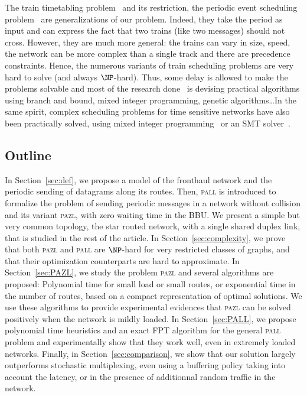 \documentclass[a4paper,10pt]{article}
\newcommand\pazl{\textsc{pazl}\xspace}
\newcommand\pall{\textsc{pall}\xspace}
\begin{document}
The train timetabling problem~\cite{lusby2011railway} and its restriction, the periodic event scheduling problem~\cite{serafini1989mathematical} are generalizations of our problem. Indeed, they take the period as input and can express the fact that two trains (like two messages) should not cross. However, they are much more general: the trains can vary in size, speed, the network can be more complex than a single track and there are precedence constraints. Hence, the numerous variants of train scheduling problems are very hard to solve (and always $\NP$-hard). Thus, some delay is allowed to make the problems solvable and most of the research done~\cite{lusby2011railway} is devising practical algorithms using branch and bound, mixed integer programming, genetic algorithms\dots  In the same spirit, complex scheduling problems for time sensitive networks have also been practically solved, using mixed integer programming~\cite{nayak2017incremental,steiner2018traffic} or an SMT solver~\cite{dos2019tsnsched}.


\subsection*{Outline}

 In Section~\ref{sec:def}, we propose a model of the fronthaul network and the periodic sending of datagrams along its routes. Then, \pall is introduced to formalize the problem of sending periodic messages in a network without collision and its variant \pazl, with zero waiting time in the BBU. We present a simple but very common topology, the star routed network, with a single shared duplex link, that is studied in the rest of the article.  In Section~\ref{sec:complexity}, we prove that both \pazl and \pall are $\NP$-hard for very restricted classes of graphs, and that their optimization counterparts are hard to approximate. 
 In Section~\ref{sec:PAZL}, we study the problem \pazl and several algorithms are proposed: Polynomial time for small load or small routes, or exponential time in the number of routes, based on a compact representation of optimal solutions. We use these algorithms to provide experimental evidences that \pazl can be solved positively when the network is mildly loaded. In Section~\ref{sec:PALL}, we propose polynomial time heuristics and an exact FPT algorithm for the general \pall problem and experimentally show that they work well, even in extremely loaded networks. 
Finally, in Section~\ref{sec:comparison}, we show that our solution largely outperforms stochastic multiplexing, even using a buffering policy taking into account the latency, or in the presence of additionnal random traffic in the network.
\end{document}
